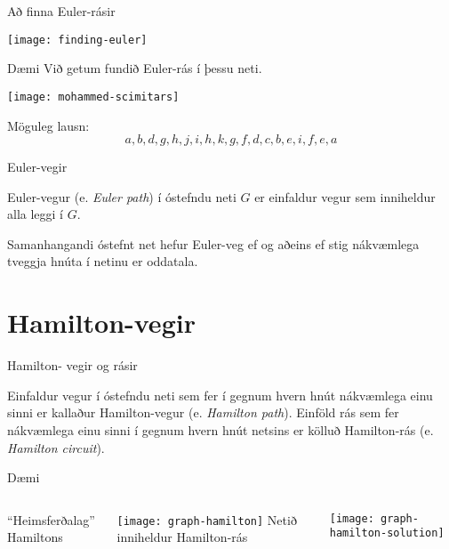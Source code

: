 \documentclass[handout]{beamer}
\begin{document}
\begin{frame}{Að finna Euler-rásir}
\begin{center}
\texttt{[image: finding-euler]}
\end{center}
\end{frame}

\begin{frame}{Dæmi}
Við getum fundið Euler-rás í þessu neti.
\begin{center}
\texttt{[image: mohammed-scimitars]}
\end{center}
\pause
Möguleg lausn:
\[
a, b, d, g, h, j, i, h, k, g, f, d, c, b, e, i, f, e, a
\]

\end{frame}

\begin{frame}{Euler-vegir}
\begin{tcolorbox}[title=Euler-vegur]
Euler-vegur (e. \emph{Euler path}) í óstefndu neti $G$ er einfaldur vegur sem inniheldur alla leggi í $G$.
\end{tcolorbox}

\begin{tcolorbox}
Samanhangandi óstefnt net hefur Euler-veg ef og aðeins ef stig nákvæmlega tveggja hnúta í netinu er oddatala.
\end{tcolorbox}
\end{frame}

\section{Hamilton-vegir}

\begin{frame}{Hamilton- vegir og rásir}
\begin{tcolorbox}[title=Hamilton-vegir og rásir]
Einfaldur vegur í óstefndu neti sem fer í gegnum hvern hnút nákvæmlega einu sinni er kallaður Hamilton-vegur (e. \emph{Hamilton path}). Einföld rás sem fer nákvæmlega einu sinni í gegnum hvern hnút netsins er kölluð Hamilton-rás (e. \emph{Hamilton circuit}).
\end{tcolorbox}
\end{frame}

\begin{frame}{Dæmi}
\begin{columns}
``Heimsferðalag'' Hamiltons

\texttt{[image: graph-hamilton]}
\pause
{}
Netið inniheldur Hamilton-rás

\texttt{[image: graph-hamilton-solution]}
\end{columns}
\end{frame}
\end{document}
